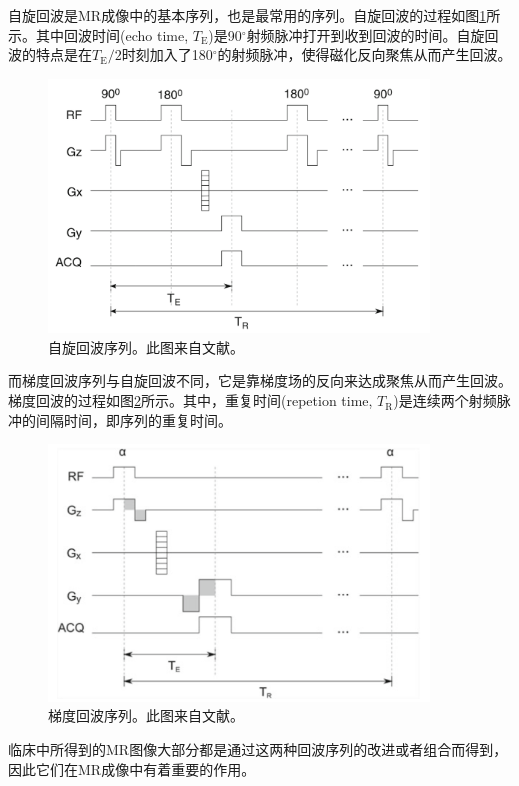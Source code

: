 自旋回波是MR成像中的基本序列，也是最常用的序列。自旋回波的过程如图\ref{fig:se}所示。其中回波时间(echo time, $T_\mathrm{E}$)是90$^\circ$射频脉冲打开到收到回波的时间。自旋回波的特点是在$T_\mathrm{E}/2$时刻加入了180$^\circ$的射频脉冲，使得磁化反向聚焦从而产生回波。
\begin{figure}[htbp]
\centerline{\includegraphics[width=0.9\textwidth]{img/intro/se.png}}
\caption{自旋回波序列。此图来自文献\cite{haidekker2013medical}。}
\label{fig:se}
\end{figure}
而梯度回波序列与自旋回波不同，它是靠梯度场的反向来达成聚焦从而产生回波。梯度回波的过程如图\ref{fig:ge}所示。其中，重复时间(repetion time, $T_\mathrm{R}$)是连续两个射频脉冲的间隔时间，即序列的重复时间。
\begin{figure}[htbp]
\centerline{\includegraphics[width=0.9\textwidth]{img/intro/ge.png}}
\caption{梯度回波序列。此图来自文献\cite{haidekker2013medical}。}
\label{fig:ge}
\end{figure}
临床中所得到的MR图像大部分都是通过这两种回波序列的改进或者组合而得到，因此它们在MR成像中有着重要的作用。

